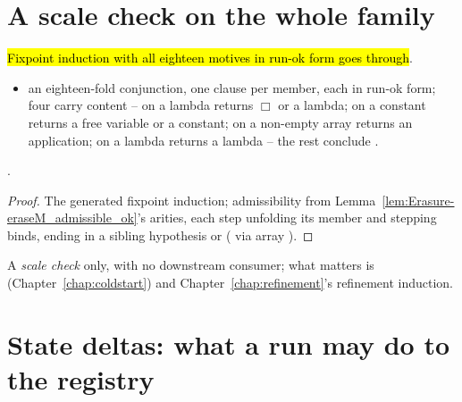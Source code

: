 \section{A scale check on the whole family}
\label{sec:run:scale}

\begin{theorem}
\label{thm:Erasure-visitExpr_run_shape}
\leanok
{}
 \hl{Fixpoint induction with all eighteen motives in run-ok form goes through}.
\begin{itemize}
\item {} an eighteen-fold conjunction, one clause per member, each in run-ok form; four
carry content --  on a lambda returns $\Box$ or a \lbox{} lambda; 
on a constant returns a free variable or a constant;  on a non-empty array
returns an application;  on a lambda returns a lambda -- the rest conclude
.
\end{itemize}
 \stProved{}.
\end{theorem}
\begin{proof}
\leanok
{}
 The generated fixpoint induction; admissibility from
Lemma~\ref{lem:Erasure-eraseM_admissible_ok}'s arities, each step unfolding its member and stepping
binds, ending in a sibling hypothesis or  ( via array ).
\end{proof}

\begin{remark}
 A \emph{scale check} only, with no downstream consumer; what matters is
 (Chapter~\ref{chap:coldstart}) and Chapter~\ref{chap:refinement}'s
refinement induction.
\end{remark}

\section{State deltas: what a run may do to the registry}
\label{sec:run:state}

